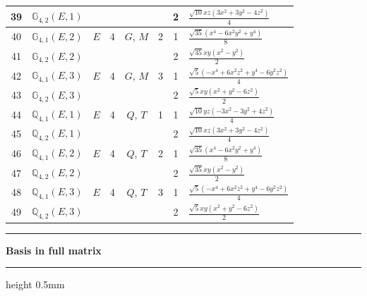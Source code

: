\documentclass[fleqn,10pt,landscape]{jsarticle}
\begin{document}
\begin{longtable}[l]{clcccccl}
39 & $\mathbb{G}_{4,2}(E,1)$ &  &  &  &  & 2 & $\frac{\sqrt{10} x z \left(3 x^{2} + 3 y^{2} - 4 z^{2}\right)}{4}$ \\ \hline
40 & $\mathbb{G}_{4,1}(E,2)$ & $E$ & 4 & $G$, $M$ & 2 & 1 & $\frac{\sqrt{35} \left(x^{4} - 6 x^{2} y^{2} + y^{4}\right)}{8}$ \\
41 & $\mathbb{G}_{4,2}(E,2)$ &  &  &  &  & 2 & $\frac{\sqrt{35} x y \left(x^{2} - y^{2}\right)}{2}$ \\ \hline
42 & $\mathbb{G}_{4,1}(E,3)$ & $E$ & 4 & $G$, $M$ & 3 & 1 & $\frac{\sqrt{5} \left(- x^{4} + 6 x^{2} z^{2} + y^{4} - 6 y^{2} z^{2}\right)}{4}$ \\
43 & $\mathbb{G}_{4,2}(E,3)$ &  &  &  &  & 2 & $\frac{\sqrt{5} x y \left(x^{2} + y^{2} - 6 z^{2}\right)}{2}$ \\ \hline
44 & $\mathbb{Q}_{4,1}(E,1)$ & $E$ & 4 & $Q$, $T$ & 1 & 1 & $\frac{\sqrt{10} y z \left(- 3 x^{2} - 3 y^{2} + 4 z^{2}\right)}{4}$ \\
45 & $\mathbb{Q}_{4,2}(E,1)$ &  &  &  &  & 2 & $\frac{\sqrt{10} x z \left(3 x^{2} + 3 y^{2} - 4 z^{2}\right)}{4}$ \\ \hline
46 & $\mathbb{Q}_{4,1}(E,2)$ & $E$ & 4 & $Q$, $T$ & 2 & 1 & $\frac{\sqrt{35} \left(x^{4} - 6 x^{2} y^{2} + y^{4}\right)}{8}$ \\
47 & $\mathbb{Q}_{4,2}(E,2)$ &  &  &  &  & 2 & $\frac{\sqrt{35} x y \left(x^{2} - y^{2}\right)}{2}$ \\ \hline
48 & $\mathbb{Q}_{4,1}(E,3)$ & $E$ & 4 & $Q$, $T$ & 3 & 1 & $\frac{\sqrt{5} \left(- x^{4} + 6 x^{2} z^{2} + y^{4} - 6 y^{2} z^{2}\right)}{4}$ \\
49 & $\mathbb{Q}_{4,2}(E,3)$ &  &  &  &  & 2 & $\frac{\sqrt{5} x y \left(x^{2} + y^{2} - 6 z^{2}\right)}{2}$ \\
\end{longtable}
\vspace{5mm}
\noindent \rule[0.5mm]{5mm}{0.5mm}\hspace{3mm}\textbf{Basis in full matrix}\hspace{3mm}\leaders\hrule height 0.5mm\hfill\kern0pt
\vspace{3mm}
\end{document}
